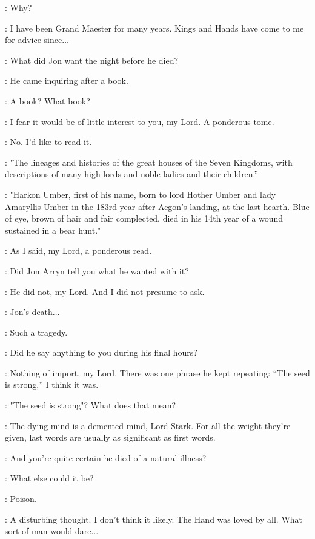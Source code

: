 \NED: Why? 

\PYCELLE: I have been Grand Maester for many years. Kings and Hands have come to me for advice since$\ldots$ 

\NED: What did Jon want the night before he died? 

\PYCELLE: He came inquiring after a book. 

\NED: A book? What book? 

\PYCELLE: I fear it would be of little interest to you, my Lord. A ponderous tome. 

\NED: No. I'd like to read it. 


\PYCELLE: "The lineages and histories of the great houses of the Seven Kingdoms, with descriptions of many high lords and noble ladies and their children.'' 

\NED: "Harkon Umber, first of his name, born to lord Hother Umber and lady Amaryllis Umber in the 183rd year after Aegon's landing, at the last hearth. Blue of eye, brown of hair and fair complected, died in his 14th year of a wound sustained in a bear hunt." 

\PYCELLE: As I said, my Lord, a ponderous read. 

\NED: Did Jon Arryn tell you what he wanted with it? 

\PYCELLE: He did not, my Lord. And I did not presume to ask. 

\NED: Jon's death$\ldots$ 

\PYCELLE: Such a tragedy. 

\NED: Did he say anything to you during his final hours? 

\PYCELLE: Nothing of import, my Lord. There was one phrase he kept repeating: ``The seed is strong,'' I think it was. 

\NED: "The seed is strong"? What does that mean? 

\PYCELLE: The dying mind is a demented mind, Lord Stark. For all the weight they're given, last words are usually as significant as first words. 

\NED: And you're quite certain he died of a natural illness? 

\PYCELLE: What else could it be? 

\NED: Poison. 

\PYCELLE: A disturbing thought. I don't think it likely. The Hand was loved by all. What sort of man would dare$\ldots$ 

